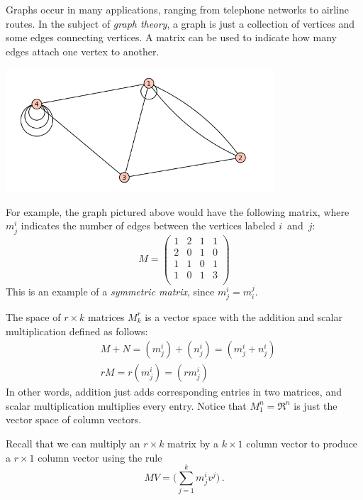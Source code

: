 
\begin{example}
Graphs occur in many applications, ranging from telephone networks to airline routes.  In the subject of \emph{graph theory}, a graph is just a collection of vertices and some edges connecting vertices.  A matrix can be used to indicate how many edges attach one vertex to another.

\begin{center}
\includegraphics[width=10cm]{notes8-0.png}
\end{center}
For example, the graph pictured above would have the following matrix, where $m^i_j$ indicates the number of edges between the vertices labeled $i$~and~$j$:
\[
M = \begin{pmatrix}
1 & 2 & 1 & 1 \\
2 & 0 & 1 & 0 \\
1 & 1 & 0 & 1 \\
1 & 0 & 1 & 3 \\
\end{pmatrix}
\]
This is an example of a \emph{symmetric matrix}, since $m_j^i = m_i^j$.
\end{example}

The space of $r\times k$ matrices $M_k^r$ is a vector space with the addition and scalar multiplication defined as follows:
\begin{align*}
&M+N = (m_j^i) + (n_j^i) = ( m_j^i + n_j^i ) \\
&rM = r(m_j^i) = (rm_j^i)
\end{align*}
In other words, addition just adds corresponding entries in two matrices, and scalar multiplication multiplies every entry.
Notice that $M_1^n = \Re^n$ is just the vector space of column vectors.

Recall that we can multiply an \(r \times k\) matrix by a \(k \times 1\) column vector to produce a \(r \times 1\) column vector using the rule
\[MV = \big(\sum_{j=1}^k m_j^i v^j\big)\, .\]

